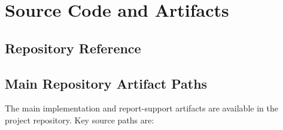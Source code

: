 \section{Source Code and Artifacts}\label{sec:appendix-source-code}

\subsection{Repository Reference}\label{subsec:appendix-repository}

\subsection{Main Repository Artifact Paths}\label{subsec:appendix-artifact-paths}

The main implementation and report-support artifacts are available in the project repository. Key source paths are:


